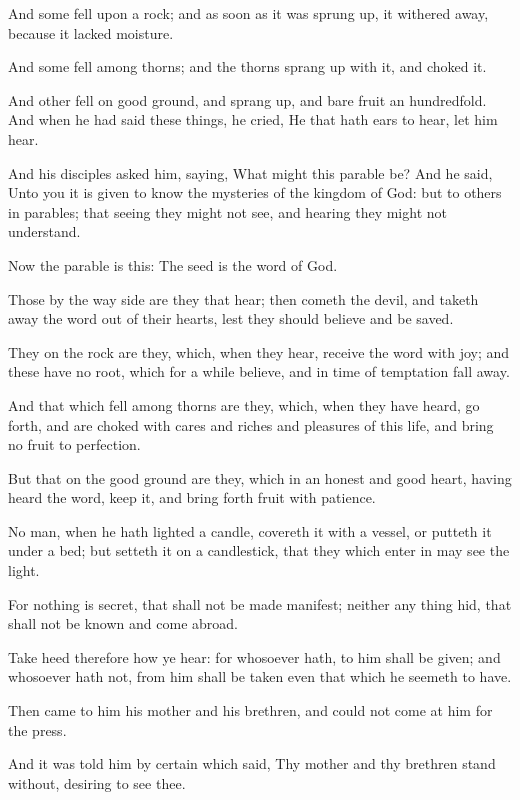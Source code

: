 \Verse And some fell upon a rock; and as soon as it was sprung up, it withered away, because it lacked moisture.

\Verse And some fell among thorns; and the thorns sprang up with it, and choked it.

\Verse And other fell on good ground, and sprang up, and bare fruit an hundredfold. And when he had said these things, he cried, He that hath ears to hear, let him hear.

\Verse And his disciples asked him, saying, What might this parable be?  \Verse And he said, Unto you it is given to know the mysteries of the kingdom of God: but to others in parables; that seeing they might not see, and hearing they might not understand.

\Verse Now the parable is this: The seed is the word of God.

\Verse Those by the way side are they that hear; then cometh the devil, and taketh away the word out of their hearts, lest they should believe and be saved.

\Verse They on the rock are they, which, when they hear, receive the word with joy; and these have no root, which for a while believe, and in time of temptation fall away.

\Verse And that which fell among thorns are they, which, when they have heard, go forth, and are choked with cares and riches and pleasures of this life, and bring no fruit to perfection.

\Verse But that on the good ground are they, which in an honest and good heart, having heard the word, keep it, and bring forth fruit with patience.

\Verse No man, when he hath lighted a candle, covereth it with a vessel, or putteth it under a bed; but setteth it on a candlestick, that they which enter in may see the light.

\Verse For nothing is secret, that shall not be made manifest; neither any thing hid, that shall not be known and come abroad.

\Verse Take heed therefore how ye hear: for whosoever hath, to him shall be given; and whosoever hath not, from him shall be taken even that which he seemeth to have.

\Verse Then came to him his mother and his brethren, and could not come at him for the press.

\Verse And it was told him by certain which said, Thy mother and thy brethren stand without, desiring to see thee.

